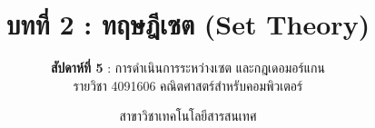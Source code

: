 
\renewcommand{\footchaptertitle}{บทที่ 2 ทฤษฎีเซต (สัปดาห์ที่ 5)}

\title{\textbf{บทที่ 2 : ทฤษฎีเซต (Set Theory)}}
\subtitle{\textbf{สัปดาห์ที่ 5} : การดำเนินการระหว่างเซต และกฎเดอมอร์แกน \\ รายวิชา 4091606 คณิตศาสตร์สำหรับคอมพิวเตอร์}
\author{สาขาวิชาเทคโนโลยีสารสนเทศ}
\date{}




